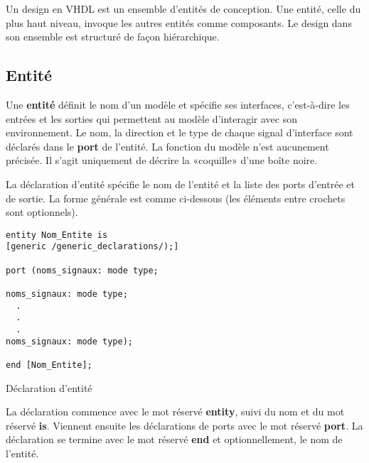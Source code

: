 \documentclass[11pt]{article}
\begin{document}
Un design en VHDL est un ensemble d'entités de conception. Une entité,
celle du plus haut niveau, invoque les autres entités comme
composants.  Le design dans son ensemble est structuré de façon
hiérarchique.

\subsection{Entité}
\label{sec:org945bdd6}

Une \textbf{entité} définit le nom d'un modèle et spécifie ses interfaces,
c'est-à-dire les entrées et les sorties qui permettent au modèle
d'interagir avec son environnement. Le nom, la direction et le type
de chaque signal d'interface sont déclarés dans le \textbf{port} de
l'entité. La fonction du modèle n'est aucunement précisée. Il s'agit
uniquement de décrire la «coquille» d'une boîte noire.

La déclaration d'entité spécifie le nom de l'entité et la liste des
ports d'entrée et de sortie. La forme générale est comme ci-dessous (les
éléments entre crochets sont optionnels). 

\begin{listing}[htbp]
\begin{verbatim}
entity Nom_Entite is 
[generic /generic_declarations/);]

port (noms_signaux: mode type;

noms_signaux: mode type;
  .
  .
  .
noms_signaux: mode type);

end [Nom_Entite];
\end{verbatim}
\caption{Déclaration d'entité}
\end{listing}

La déclaration commence avec le mot réservé \textbf{entity}, suivi du nom et
du mot réservé \textbf{is}. Viennent ensuite les déclarations de ports avec le
mot réservé \textbf{port}. La déclaration se termine avec le mot réservé
\textbf{end} et optionnellement, le nom de l'entité.
\end{document}
